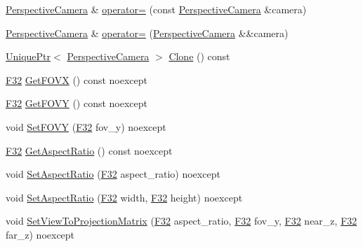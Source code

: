 \begin{DoxyCompactItemize}
\item 
\hyperlink{classmage_1_1_perspective_camera}{Perspective\+Camera} \& \hyperlink{classmage_1_1_perspective_camera_a0fe5ef8bd4d28efa8e4851a8055b6fa5}{operator=} (const \hyperlink{classmage_1_1_perspective_camera}{Perspective\+Camera} \&camera)
\item 
\hyperlink{classmage_1_1_perspective_camera}{Perspective\+Camera} \& \hyperlink{classmage_1_1_perspective_camera_a338c75900237f3623b31b0231a5f5782}{operator=} (\hyperlink{classmage_1_1_perspective_camera}{Perspective\+Camera} \&\&camera)
\item 
\hyperlink{namespacemage_a3316d7143a973e37adf1110f2e80ca31}{Unique\+Ptr}$<$ \hyperlink{classmage_1_1_perspective_camera}{Perspective\+Camera} $>$ \hyperlink{classmage_1_1_perspective_camera_a21545965da7ef1b6f99887bb6d2bb095}{Clone} () const
\item 
\hyperlink{namespacemage_aa97e833b45f06d60a0a9c4fc22ae02c0}{F32} \hyperlink{classmage_1_1_perspective_camera_a743acc9d0f30986788a548b78ff6d0d0}{Get\+F\+O\+VX} () const noexcept
\item 
\hyperlink{namespacemage_aa97e833b45f06d60a0a9c4fc22ae02c0}{F32} \hyperlink{classmage_1_1_perspective_camera_a753f4479a5a13000864c297bc34c051f}{Get\+F\+O\+VY} () const noexcept
\item 
void \hyperlink{classmage_1_1_perspective_camera_ab3ffcf555ef03f783b5723d7a48b8014}{Set\+F\+O\+VY} (\hyperlink{namespacemage_aa97e833b45f06d60a0a9c4fc22ae02c0}{F32} fov\+\_\+y) noexcept
\item 
\hyperlink{namespacemage_aa97e833b45f06d60a0a9c4fc22ae02c0}{F32} \hyperlink{classmage_1_1_perspective_camera_a1d0b6de98514c1fdaf3e1aac4971987b}{Get\+Aspect\+Ratio} () const noexcept
\item 
void \hyperlink{classmage_1_1_perspective_camera_a60fda2d54481a0f4c04fe8a08a8d729b}{Set\+Aspect\+Ratio} (\hyperlink{namespacemage_aa97e833b45f06d60a0a9c4fc22ae02c0}{F32} aspect\+\_\+ratio) noexcept
\item 
void \hyperlink{classmage_1_1_perspective_camera_ab54d9fe7a52955201d37af521c9e9727}{Set\+Aspect\+Ratio} (\hyperlink{namespacemage_aa97e833b45f06d60a0a9c4fc22ae02c0}{F32} width, \hyperlink{namespacemage_aa97e833b45f06d60a0a9c4fc22ae02c0}{F32} height) noexcept
\item 
void \hyperlink{classmage_1_1_perspective_camera_a988390ca5bac4f3fcfb66aa7fc7effc8}{Set\+View\+To\+Projection\+Matrix} (\hyperlink{namespacemage_aa97e833b45f06d60a0a9c4fc22ae02c0}{F32} aspect\+\_\+ratio, \hyperlink{namespacemage_aa97e833b45f06d60a0a9c4fc22ae02c0}{F32} fov\+\_\+y, \hyperlink{namespacemage_aa97e833b45f06d60a0a9c4fc22ae02c0}{F32} near\+\_\+z, \hyperlink{namespacemage_aa97e833b45f06d60a0a9c4fc22ae02c0}{F32} far\+\_\+z) noexcept

\end{DoxyCompactItemize}
